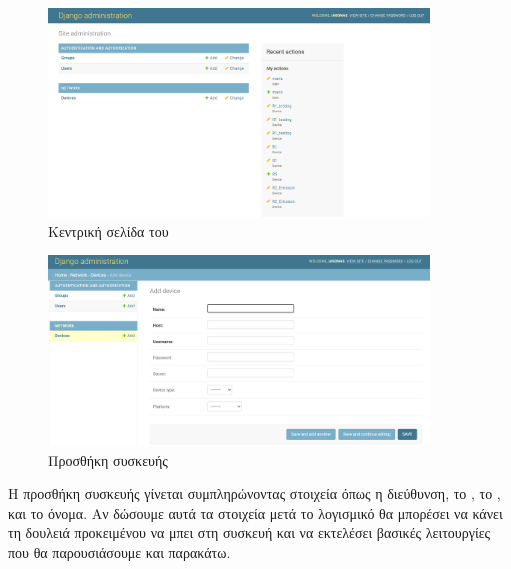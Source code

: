 \begin{figure}[htb]
	\centering
	\includegraphics[width=0.9\textwidth]{graphics/DJANGO_ADMIN.png}
	\caption{Κεντρική σελίδα του }
\end{figure}

\begin{figure}[htb]
	\centering
	\includegraphics[width=0.9\textwidth]{graphics/ADD_DEVICE.png}
	\caption{Προσθήκη συσκευής }
\end{figure}


 Η προσθήκη συσκευής γίνεται συμπληρώνοντας στοιχεία όπως η  διεύθυνση, το , το  , και το όνομα. Αν δώσουμε αυτά τα στοιχεία
 μετά το λογισμικό θα μπορέσει να κάνει τη δουλειά προκειμένου να μπει στη συσκευή και να εκτελέσει βασικές λειτουργίες που θα παρουσιάσουμε και παρακάτω. 







 
